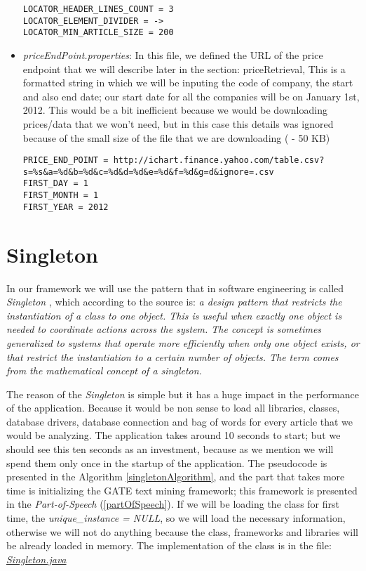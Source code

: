 \begin{itemize}
\begin{lstlisting}
LOCATOR_HEADER_LINES_COUNT = 3
LOCATOR_ELEMENT_DIVIDER = ->
LOCATOR_MIN_ARTICLE_SIZE = 200
\end{lstlisting}
	
	\item \emph{priceEndPoint.properties}: In this file, we defined the URL of the price endpoint that we will describe later in the section: {priceRetrieval}, This is a formatted string in which we will be inputing the code of company, the start and also end date; our start date for all the companies will be on January 1st, 2012. This would be a bit inefficient because we would be downloading prices/data that we won't need, but in this case this details was ignored because of the small size of the file that we are downloading ( - 50 KB)

\begin{lstlisting}
PRICE_END_POINT = http://ichart.finance.yahoo.com/table.csv? s=%s&a=%d&b=%d&c=%d&d=%d&e=%d&f=%d&g=d&ignore=.csv
FIRST_DAY = 1
FIRST_MONTH = 1
FIRST_YEAR = 2012
\end{lstlisting}
	
\end{itemize}

\section{Singleton}

In our framework we will use the pattern that in software engineering is called \emph{Singleton} \cite{S2014}, which according to the source is: \emph{a design pattern that restricts the instantiation of a class to one object. This is useful when exactly one object is needed to coordinate actions across the system. The concept is sometimes generalized to systems that operate more efficiently when only one object exists, or that restrict the instantiation to a certain number of objects. The term comes from the mathematical concept of a singleton.}

The reason of the \emph{Singleton} is simple but it has a huge impact in the performance of the application. Because it would be non sense to load all libraries, classes, database drivers, database connection and bag of words for every article that we would be analyzing. The application takes around 10 seconds to start; but we should see this ten seconds as an investment, because as we mention we will spend them only once in the startup of the application. The pseudocode is presented in the Algorithm \ref{singletonAlgorithm}, and the part that takes more time is initializing the GATE text mining framework; this framework is presented in the \emph{Part-of-Speech} (\ref{partOfSpeech}). If we will be loading the class for first time, the \emph{unique\_instance = NULL}, so we will load the necessary information, otherwise we will not do anything because the class, frameworks and libraries will be already loaded in memory. The implementation of the class is in the file: \emph{\ul{Singleton.java}}

